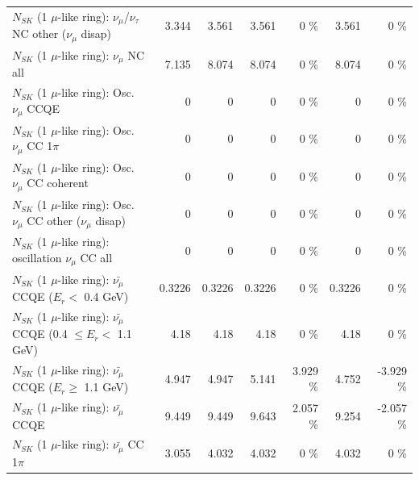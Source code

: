 \begin{table}
\begin{tabular}{| l | r | r | r  r | r  r |}
   $N_{SK}$ (1 $\mu$-like ring): $\nu_\mu$/$\nu_\tau$ NC other ($\nu_\mu$ disap) &           3.344 &           3.561 &           3.561 &        0 \%  &           3.561 &        0 \%  \\ 
                                $N_{SK}$ (1 $\mu$-like ring): $\nu_{\mu}$ NC all &           7.135 &           8.074 &           8.074 &        0 \%  &           8.074 &        0 \%  \\ 
\hline
\hline
                               $N_{SK}$ (1 $\mu$-like ring): Osc. $\nu_\mu$ CCQE &               0 &               0 &               0 &        0 \%  &               0 &        0 \%  \\ 
                          $N_{SK}$ (1 $\mu$-like ring): Osc. $\nu_\mu$ CC 1$\pi$ &               0 &               0 &               0 &        0 \%  &               0 &        0 \%  \\ 
                        $N_{SK}$ (1 $\mu$-like ring): Osc. $\nu_\mu$ CC coherent &               0 &               0 &               0 &        0 \%  &               0 &        0 \%  \\ 
         $N_{SK}$ (1 $\mu$-like ring): Osc. $\nu_\mu$ CC other ($\nu_\mu$ disap) &               0 &               0 &               0 &        0 \%  &               0 &        0 \%  \\ 
                      $N_{SK}$ (1 $\mu$-like ring): oscillation $\nu_\mu$ CC all &               0 &               0 &               0 &        0 \%  &               0 &        0 \%  \\ 
\hline
\hline
          $N_{SK}$ (1 $\mu$-like ring): $\bar{\nu_\mu}$ CCQE ($E_{r} <$ 0.4 GeV) &          0.3226 &          0.3226 &          0.3226 &        0 \%  &          0.3226 &        0 \%  \\ 
 $N_{SK}$ (1 $\mu$-like ring): $\bar{\nu_\mu}$ CCQE (0.4 $\leq E_{r} <$ 1.1 GeV) &            4.18 &            4.18 &            4.18 &        0 \%  &            4.18 &        0 \%  \\ 
       $N_{SK}$ (1 $\mu$-like ring): $\bar{\nu_\mu}$ CCQE ($E_{r} \geq$ 1.1 GeV) &           4.947 &           4.947 &           5.141 &    3.929 \%  &           4.752 &   -3.929 \%  \\ 
\hline
                              $N_{SK}$ (1 $\mu$-like ring): $\bar{\nu_\mu}$ CCQE &           9.449 &           9.449 &           9.643 &    2.057 \%  &           9.254 &   -2.057 \%  \\ 
                         $N_{SK}$ (1 $\mu$-like ring): $\bar{\nu_\mu}$ CC 1$\pi$ &           3.055 &           4.032 &           4.032 &        0 \%  &           4.032 &        0 \%  \\ 

\end{tabular}
\end{table}
